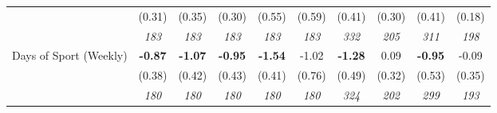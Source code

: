\begin{tabular}{l c c c c c c c c c}
& (0.31) & (0.35) & (0.30) & (0.55) & (0.59) & (0.41) & (0.30) & (0.41) & (0.18) \\
& \textit{ 183 } & \textit{ 183 } & \textit{ 183 } & \textit{ 183 } & \textit{ 183 } & \textit{ 332 } & \textit{ 205 } & \textit{ 311 } & \textit{ 198 } \\
Days of Sport (Weekly) & \textbf{ -0.87 } & \textbf{ -1.07 } & \textbf{ -0.95 } & \textbf{-1.54} & -1.02 & \textbf{ -1.28 } & 0.09 & \textbf{ -0.95 } & -0.09 \\
& (0.38) & (0.42) & (0.43) & (0.41) & (0.76) & (0.49) & (0.32) & (0.53) & (0.35) \\
& \textit{ 180 } & \textit{ 180 } & \textit{ 180 } & \textit{ 180 } & \textit{ 180 } & \textit{ 324 } & \textit{ 202 } & \textit{ 299 } & \textit{ 193 } \\
\bottomrule
\end{tabular}
